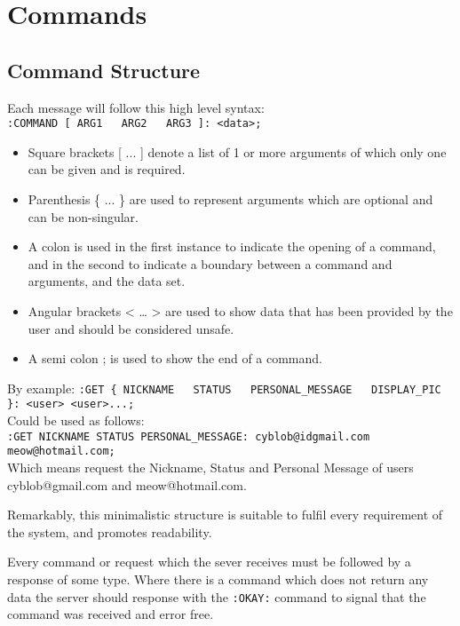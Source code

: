 \section{Commands}

\subsection{Command Structure}

Each message will follow this high level syntax: \\
\texttt{:COMMAND [ ARG1 \ \vline \ ARG2 \ \vline \ ARG3 ]: <data>;} \\

\begin{itemize}

\item{Square brackets [ ... ] denote a list of 1 or more arguments of which only one can be given and is required.}  

\item{Parenthesis \{ ... \} are used to represent arguments which are optional and can be non-singular.}

\item{A colon is used in the first instance to indicate the opening of a command, and in the second to indicate a boundary between a command and arguments, and the data set.}

\item{Angular brackets < … > are used to show data that has been provided by the user and should be considered unsafe.}

\item{A semi colon ; is used to show the end of a command.}

\end{itemize}

By example:
\texttt{:GET \{ NICKNAME \ \vline \ STATUS \ \vline \ PERSONAL\_MESSAGE \ \vline \ DISPLAY\_PIC \}: <user> <user>...;}\\
Could be used as follows: \\
\texttt{:GET NICKNAME STATUS PERSONAL\_MESSAGE: cyblob@idgmail.com meow@hotmail.com;} \\
Which means request the Nickname, Status and Personal Message of users cyblob@gmail.com and meow@hotmail.com.

Remarkably, this minimalistic structure is suitable to fulfil every requirement of the system, and promotes readability.

Every command or request which the sever receives must be followed by a response of some type. Where there is a command which does not return any data the server should response with the \texttt{:OKAY:} command to signal that the command was received and error free.

